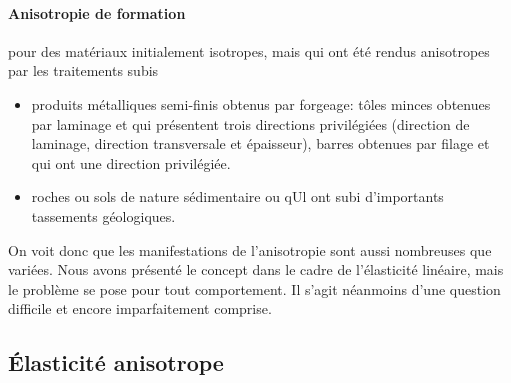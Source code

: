 \paragraph{Anisotropie de formation} pour des matériaux initialement isotropes, mais qui ont été rendus anisotropes par les traitements subis
\begin{itemize}
    \item produits métalliques semi-finis obtenus par forgeage: tôles minces obtenues par laminage et qui présentent trois directions privilégiées (direction de laminage, direction transversale et épaisseur), barres obtenues par filage et qui ont une direction privilégiée.
    \item roches ou sols de nature sédimentaire ou qUl ont subi d'importants 
tassements géologiques.
\end{itemize}

On voit donc que les manifestations de l'anisotropie sont aussi nombreuses que variées.
Nous avons présenté le concept dans le cadre de l'élasticité linéaire, mais le problème se pose pour tout comportement.
Il s'agit néanmoins d'une question difficile et encore imparfaitement comprise. 

\subsection{Élasticité anisotrope}\endinput 
Les propriétés de symétrie, décrites par le groupe d'isotropie ~ , permettent de réduire le nombre des coefficients d'élasticité. Nous allons envisager quelques cas particuliers correspondant aux types d'anisotropie que l'on rencontre le plus f~équemment en mécanique. 
a) Orthotropie. Il existe trois directions privilégiées mutuellement or[ho­gona1es, et le groupe d'isotropie est formé des symétries laissant invarian­tes chacune de ces trois directions (non orientées), càd des symétries par rapport aux axes correspondants. Si nous choisissons le repère formé par ces trois directions, alors le groupe d'isotropie ~ est formé des 4 matrices 
(15) [~::] I~ -~:] [-~ ~ ~] [-~ -~ ~l 
o 0 1 0 0 -1 0 0 -1 0 0-1 
En écrivant (14) pour ces matrices, on obtient directement la nullité des coefficients A.H1~ , A~~H ' A.1i!-~ , A~t .. ~ , etc ... , et la matrice d'élasti­cité a la forme suivante 
o:;~ 
<r.w, 0";; 
( 16) 
0;,; <r3~ <r~l, 
= 




o 

o o 
o o 
C,. o 
o o 

